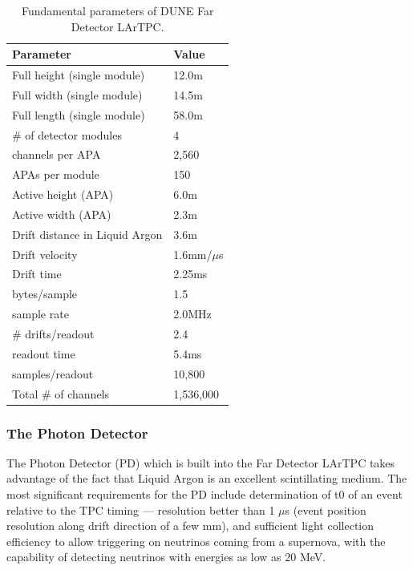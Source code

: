 \begin{table}[ht!]
	\centering
	\begin{tabular}{| p{2.5in} | p{1in} |}
		\hline
		\textbf{Parameter} & \textbf{Value} \\ \hline
		Full height (single module) & 12.0m \\ \hline
		Full width (single module) & 14.5m \\ \hline
		Full length (single module) & 58.0m \\ \hline
		\# of detector modules & 4 \\ \hline
		\hline
		channels per APA & 2,560 \\ \hline
		APAs per module & 150 \\ \hline
		Active height (APA) & 6.0m \\ \hline
		Active width (APA) & 2.3m \\ \hline  \hline
		Drift distance in Liquid Argon & 3.6m \\
		\hline
		Drift velocity & 1.6mm/$\mu$s \\ \hline
		Drift time & 2.25ms \\ \hline
		\hline
		bytes/sample & 1.5 \\ \hline
		sample rate & 2.0MHz \\ \hline
		\# drifts/readout & 2.4 \\ \hline
		\hline
		readout time & 5.4ms \\ \hline
		samples/readout & 10,800 \\
		\hline \hline
		Total \# of channels & 1,536,000 \\
		\hline
	\end{tabular}
	\caption{Fundamental parameters of DUNE Far Detector LArTPC.}
	\label{tab:fundamental-parameters}
\end{table}

\subsubsection{The Photon Detector}
\label{sec:pd}
The Photon Detector (PD) which is built into the Far Detector LArTPC takes advantage of the fact that Liquid Argon
is an excellent scintillating medium.
The most significant requirements for the PD include determination of t0 of an event relative to the TPC timing ---
resolution better than 1 $\mu$s (event position resolution along drift direction of a few mm), and sufficient light
collection efficiency to allow triggering on neutrinos coming from a supernova, with the capability of detecting neutrinos with energies as
low as 20 MeV.

